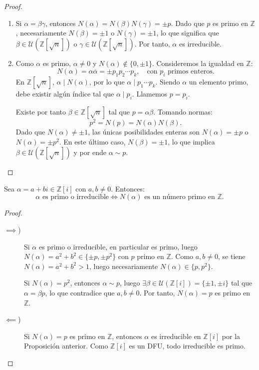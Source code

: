 \begin{proof}
    \leavevmode
    \begin{enumerate}[label=\arabic*)]
        \item Si $\alpha = \beta \gamma$, entonces $N(\alpha) = N(\beta) N(\gamma) = \pm p$. Dado que $p$ es primo en $\mathbb{Z}$, necesariamente $N(\beta) = \pm 1$ o $N(\gamma) = \pm 1$, lo que significa que $\beta \in \mathcal{U}(\mathbb{Z}[\sqrt{n}])$ o $\gamma \in \mathcal{U}(\mathbb{Z}[\sqrt{n}])$. Por tanto, $\alpha$ es irreducible.

        \item Como $\alpha$ es primo, $\alpha \neq 0$ y $N(\alpha) \notin \{0, \pm 1\}$. Consideremos la igualdad en $\mathbb{Z}$:
        \[
            N(\alpha) = \alpha \overline{\alpha} = \pm p_1 p_2 \cdots p_k, \quad \text{con } p_i \text{ primos enteros.}
        \]
        En $\mathbb{Z}[\sqrt{n}]$, $\alpha \mid N(\alpha)$, por lo que $\alpha \mid p_1 \cdots p_k$. Siendo $\alpha$ un elemento primo, debe existir algún índice tal que $\alpha \mid p_i$. Llamemos $p = p_i$.

        Existe por tanto $\beta \in \mathbb{Z}[\sqrt{n}]$ tal que $p = \alpha \beta$. Tomando normas:
        \[
            p^2 = N(p) = N(\alpha) N(\beta).
        \]
        Dado que $N(\alpha) \neq \pm 1$, las únicas posibilidades enteras son $N(\alpha) = \pm p$ o $N(\alpha) = \pm p^2$. En este último caso, $N(\beta) = \pm 1$, lo que implica $\beta \in \mathcal{U}(\mathbb{Z}[\sqrt{n}])$ y por ende $\alpha \sim p$. \qedhere
    \end{enumerate}
\end{proof}

\begin{lema}
    Sea $\alpha = a + bi \in \mathbb{Z}[i]$ con $a, b \neq 0$. Entonces:
    \[
        \alpha \text{ es primo o irreducible} \iff N(\alpha) \text{ es un número primo en } \mathbb{Z}.
    \]
\end{lema}
\begin{proof}
    \leavevmode
    \begin{description}
        \item[$\implies$)] Si $\alpha$ es primo o irreducible, en particular es primo, luego $N(\alpha) = a^2 + b^2\in\{\pm p, \pm p^2\}$ con $p$ primo en $\mathbb{Z}$. Como $a, b \neq 0$, se tiene $N(\alpha) = a^2 + b^2 > 1$, luego necesariamente $N(\alpha)\in \{p, p^2\}$.
        
        Si $N(\alpha) = p^2$, entonces $\alpha \sim p$, luego $\exists \beta \in \mathcal{U}(\mathbb{Z}[i])=\{\pm 1, \pm i\}$ tal que $\alpha = \beta p$, lo que contradice que $a, b \neq 0$. Por tanto, $N(\alpha) = p$ es primo en $\mathbb{Z}$.

        \item[$\impliedby$)] Si $N(\alpha) = p$ es primo en $\mathbb{Z}$, entonces $\alpha$ es irreducible en $\mathbb{Z}[i]$ por la Proposición anterior. Como $\mathbb{Z}[i]$ es un DFU, todo irreducible es primo.
    \end{description}
\end{proof}

